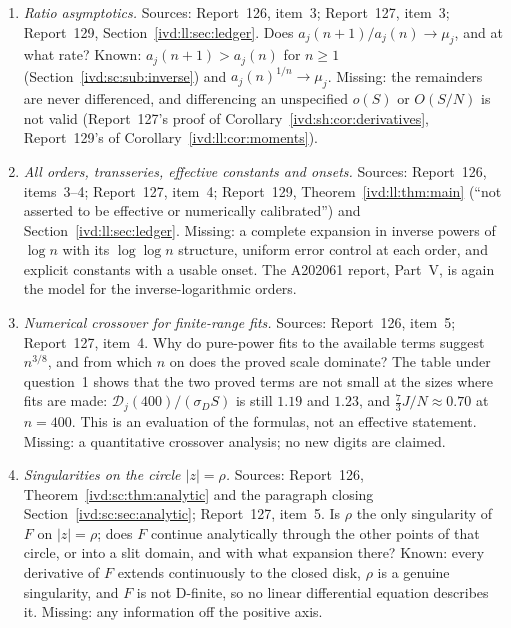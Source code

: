 \documentclass[11pt,letterpaper]{article}
\theoremstyle{remark}\newtheorem{remark}[theorem]{Remark}
\numberwithin{equation}{section}
\newcommand{\Dfc}{\mathcal D}
\begin{document}
\begin{enumerate}
\item \emph{Ratio asymptotics.} Sources: Report~126, item~3; Report~127, item~3; Report~129, Section~\ref{ivd:ll:sec:ledger}. Does $a_j(n+1)/a_j(n)\to\mu_j$, and at what rate? Known: $a_j(n+1)>a_j(n)$ for $n\ge1$ (Section~\ref{ivd:sc:sub:inverse}) and $a_j(n)^{1/n}\to\mu_j$. Missing: the remainders are never differenced, and differencing an unspecified $o(S)$ or $O(S/N)$ is not valid (Report~127's proof of Corollary~\ref{ivd:sh:cor:derivatives}, Report~129's of Corollary~\ref{ivd:ll:cor:moments}).
\item \emph{All orders, transseries, effective constants and onsets.} Sources: Report~126, items~3--4; Report~127, item~4; Report~129, Theorem~\ref{ivd:ll:thm:main} (``not asserted to be effective or numerically calibrated'') and Section~\ref{ivd:ll:sec:ledger}. Missing: a complete expansion in inverse powers of $\log n$ with its $\log\log n$ structure, uniform error control at each order, and explicit constants with a usable onset. The A202061 report, Part~V, is again the model for the inverse-logarithmic orders.
\item \emph{Numerical crossover for finite-range fits.} Sources: Report~126, item~5; Report~127, item~4. Why do pure-power fits to the available terms suggest $n^{3/8}$, and from which $n$ on does the proved scale dominate? The table under question~1 shows that the two proved terms are not small at the sizes where fits are made: $\Dfc_j(400)/(\sigma_DS)$ is still $1.19$ and $1.23$, and $\frac73J/N\approx0.70$ at $n=400$. This is an evaluation of the formulas, not an effective statement. Missing: a quantitative crossover analysis; no new digits are claimed.
\item \emph{Singularities on the circle $|z|=\rho$.} Sources: Report~126, Theorem~\ref{ivd:sc:thm:analytic} and the paragraph closing Section~\ref{ivd:sc:sec:analytic}; Report~127, item~5. Is $\rho$ the only singularity of $F$ on $|z|=\rho$; does $F$ continue analytically through the other points of that circle, or into a slit domain, and with what expansion there? Known: every derivative of $F$ extends continuously to the closed disk, $\rho$ is a genuine singularity, and $F$ is not D-finite, so no linear differential equation describes it. Missing: any information off the positive axis.
\end{enumerate}
\end{document}
